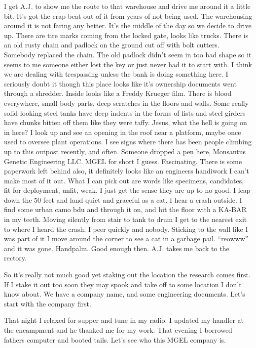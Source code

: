 I get A.J. to show me the route to that warehouse and drive me around it a little bit. It's got the crap beat out of it from years of not being used. The warehousing around it is not faring any better. It's the middle of the day so we decide to drive up. There are tire marks coming from the locked gate, looks like trucks. There is an old rusty chain and padlock on the ground cut off with bolt cutters. Somebody replaced the chain. The old padlock didn't seem in too bad shape so it seems to me someone either lost the key or just never had it to start with. I think we are dealing with trespassing unless the bank is doing something here. I seriously doubt it though this place looks like it's ownership documents went through a shredder. Inside looks like a Freddy Krueger film. There is blood everywhere, small body parts, deep scratches in the floors and walls. Some really solid looking steel tanks have deep indents in the forms of fists and steel girders have chunks bitten off them like they were taffy. Jesus, what the hell is going on in here? I look up and see an opening in the roof near a platform, maybe once used to oversee plant operations. I see signs where there has been people climbing up to this outpost recently, and often. Someone dropped a pen here, Monsantus Genetic Engineering LLC. MGEL for short I guess. Fascinating. There is some paperwork left behind also, it definitely looks like an engineers handiwork I can't make most of it out. What I can pick out are words like specimens, candidates, fit for deployment, unfit, weak. I just get the sense they are up to no good. I leap down the 50 feet and land quiet and graceful as a cat. I hear a crash outside. I find some urban camo bdu and through it on, and hit the floor with a KA-BAR in my teeth. Moving silently from stair to tank to drum I get to the nearest exit to where I heard the crash. I peer quickly and nobody. Sticking to the wall like I was part of it I move around the corner to see a cat in a garbage pail. ``reowww'' and it was gone. Handpalm. Good enough then. A.J. takes me back to the rectory.

So it's really not much good yet staking out the location the research comes first. If I stake it out too soon they may spook and take off to some location I don't know about. We have a company name, and some engineering documents. Let's start with the company first.

That night I relaxed for supper and tune in my radio. I updated my handler at the encampment and he thanked me for my work. That evening I borrowed fathers computer and booted tails. Let's see who this MGEL company is.

